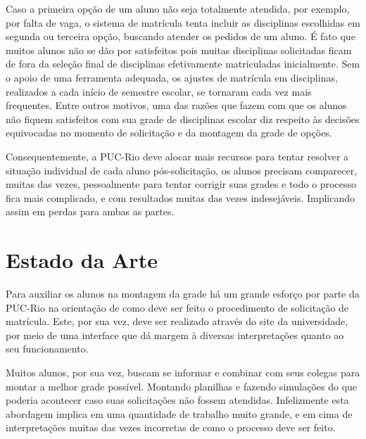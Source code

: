 \documentclass[graduacao,brazil]{ThesisPUC}
\begin{document}
Caso a primeira opção de um aluno não seja totalmente atendida, por exemplo, por falta de vaga, o sistema de matrícula tenta incluir as disciplinas escolhidas em segunda ou terceira opção, buscando atender os pedidos de um aluno. É fato que muitos alunos não se dão por satisfeitos pois muitas disciplinas solicitadas ficam de fora da seleção final de disciplinas efetivamente matriculadas inicialmente. Sem o apoio de uma ferramenta adequada, os ajustes de matrícula em disciplinas, realizados a cada início de semestre escolar, se tornaram cada vez mais frequentes. Entre outros motivos, uma das razões que fazem com que os alunos não fiquem satisfeitos com sua grade de disciplinas escolar diz respeito às decisões equivocadas no momento de solicitação e da montagem da grade de opções.

Consequentemente, a PUC-Rio deve alocar mais recursos para tentar resolver a situação individual de cada aluno pós-solicitação, os alunos precisam comparecer, muitas das vezes, pessoalmente para tentar corrigir suas grades e todo o processo fica mais complicado, e com resultados muitas das vezes indesejáveis. Implicando assim em perdas para ambas as partes.



\chapter{Estado da Arte}

Para auxiliar os alunos na montagem da grade há um grande esforço por parte da PUC-Rio na orientação de como deve ser feito o procedimento de solicitação de matrícula. Este, por sua vez, deve ser realizado através do site da universidade, por meio de uma interface que dá margem à diversas interpretações quanto ao seu funcionamento.

Muitos alunos, por sua vez, buscam se informar e combinar com seus colegas para montar a melhor grade possível. Montando planilhas e fazendo simulações do que poderia acontecer caso suas solicitações não fossem atendidas. Infelizmente esta abordagem implica em uma quantidade de trabalho muito grande, e em cima de interpretações muitas das vezes incorretas de como o processo deve ser feito.
\end{document}
